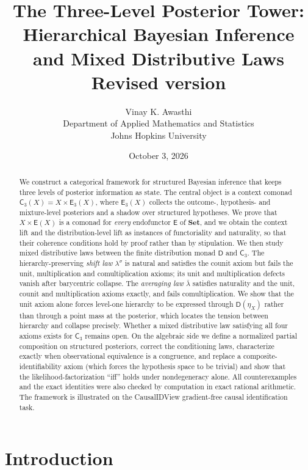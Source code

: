 \documentclass[11pt]{article}
\title{The Three-Level Posterior Tower:\\
Hierarchical Bayesian Inference and Mixed Distributive Laws\\[4pt]
\large Revised version}
\author{Vinay K. Awasthi\\
Department of Applied Mathematics and Statistics\\
Johns Hopkins University}
\date{October 3, 2026}
\theoremstyle{definition}
\theoremstyle{remark}
\newcommand{\D}{\mathsf{D}}
\newcommand{\Set}{\mathbf{Set}}
\newcommand{\C}{\mathsf{C}}
\newcommand{\E}{\mathsf{E}}
\newcommand{\lb}{\bar\lambda}
\newcommand{\ls}{\lambda^{\sigma}}
\begin{document}
\maketitle

\begin{abstract}
We construct a categorical framework for structured Bayesian inference that keeps three levels of
posterior information as state. The central object is a context comonad $\C_3(X)=X\times\E_3(X)$,
where $\E_3(X)$ collects the outcome-, hypothesis- and mixture-level posteriors and a shadow over
structured hypotheses. We prove that $X\times \E(X)$ is a comonad for \emph{every} endofunctor $\E$
of $\Set$, and we obtain the context lift and the distribution-level lift as instances of
functoriality and naturality, so that their coherence conditions hold by proof rather than by
stipulation. We then study mixed distributive laws between the finite distribution monad $\D$ and
$\C_3$. The hierarchy-preserving \emph{shift law} $\ls$ is natural and satisfies the counit axiom but
fails the unit, multiplication and comultiplication axioms; its unit and multiplication defects
vanish after barycentric collapse. The \emph{averaging law} $\lb$ satisfies naturality and the unit,
counit and multiplication axioms exactly, and fails comultiplication. We show that the unit axiom
alone forces level-one hierarchy to be expressed through $\D(\eta_X)$ rather than through a point mass
at the posterior, which locates the tension between hierarchy and collapse precisely. Whether a
mixed distributive law satisfying all four axioms exists for $\C_3$ remains open. On the algebraic
side we define a normalized partial composition on structured posteriors, correct the conditioning
laws, characterize exactly when observational equivalence is a congruence, and replace a
composite-identifiability axiom (which forces the hypothesis space to be trivial) and show that
the likelihood-factorization ``iff'' holds under nondegeneracy alone. All counterexamples and
the exact identities were also checked by computation in exact rational arithmetic. The framework is
illustrated on the CausalIDView gradient-free causal identification task.
\end{abstract}

\tableofcontents

\section{Introduction}
\end{document}
